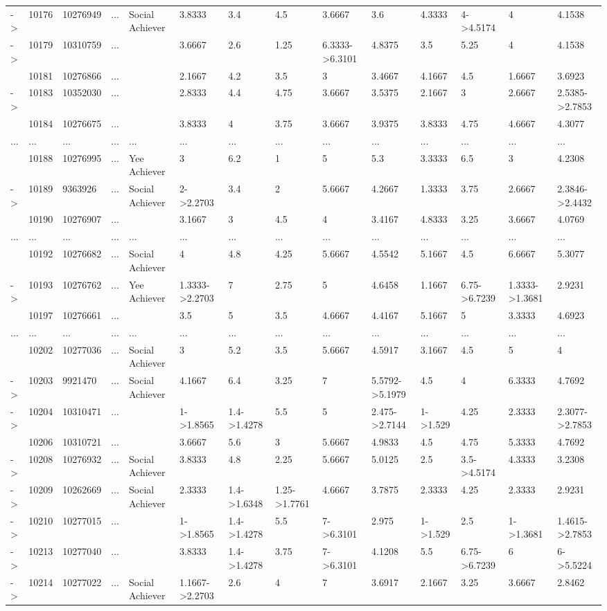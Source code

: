 \documentclass[6pt,a4paper]{article}
\begin{document}
\begin{landscape}
{\begin{longtable}{llllllllllllll}
-\textgreater &10176&10276949&...&Social Achiever&3.8333&3.4&4.5&3.6667&3.6&4.3333&4-\textgreater 4.5174&4&4.1538\tabularnewline
-\textgreater &10179&10310759&...&&3.6667&2.6&1.25&6.3333-\textgreater 6.3101&4.8375&3.5&5.25&4&4.1538\tabularnewline
&10181&10276866&...&&2.1667&4.2&3.5&3&3.4667&4.1667&4.5&1.6667&3.6923\tabularnewline
-\textgreater &10183&10352030&...&&2.8333&4.4&4.75&3.6667&3.5375&2.1667&3&2.6667&2.5385-\textgreater 2.7853\tabularnewline
&10184&10276675&...&&3.8333&4&3.75&3.6667&3.9375&3.8333&4.75&4.6667&4.3077\tabularnewline
...&...&...&...&...&...&...&...&...&...&...&...&...&...\tabularnewline
&10188&10276995&...&Yee Achiever&3&6.2&1&5&5.3&3.3333&6.5&3&4.2308\tabularnewline
-\textgreater &10189&9363926&...&Social Achiever&2-\textgreater 2.2703&3.4&2&5.6667&4.2667&1.3333&3.75&2.6667&2.3846-\textgreater 2.4432\tabularnewline
&10190&10276907&...&&3.1667&3&4.5&4&3.4167&4.8333&3.25&3.6667&4.0769\tabularnewline
...&...&...&...&...&...&...&...&...&...&...&...&...&...\tabularnewline
&10192&10276682&...&Social Achiever&4&4.8&4.25&5.6667&4.5542&5.1667&4.5&6.6667&5.3077\tabularnewline
-\textgreater &10193&10276762&...&Yee Achiever&1.3333-\textgreater 2.2703&7&2.75&5&4.6458&1.1667&6.75-\textgreater 6.7239&1.3333-\textgreater 1.3681&2.9231\tabularnewline
&10197&10276661&...&&3.5&5&3.5&4.6667&4.4167&5.1667&5&3.3333&4.6923\tabularnewline
...&...&...&...&...&...&...&...&...&...&...&...&...&...\tabularnewline
&10202&10277036&...&Social Achiever&3&5.2&3.5&5.6667&4.5917&3.1667&4.5&5&4\tabularnewline
-\textgreater &10203&9921470&...&Social Achiever&4.1667&6.4&3.25&7&5.5792-\textgreater 5.1979&4.5&4&6.3333&4.7692\tabularnewline
-\textgreater &10204&10310471&...&&1-\textgreater 1.8565&1.4-\textgreater 1.4278&5.5&5&2.475-\textgreater 2.7144&1-\textgreater 1.529&4.25&2.3333&2.3077-\textgreater 2.7853\tabularnewline
&10206&10310721&...&&3.6667&5.6&3&5.6667&4.9833&4.5&4.75&5.3333&4.7692\tabularnewline
-\textgreater &10208&10276932&...&Social Achiever&3.8333&4.8&2.25&5.6667&5.0125&2.5&3.5-\textgreater 4.5174&4.3333&3.2308\tabularnewline
-\textgreater &10209&10262669&...&Social Achiever&2.3333&1.4-\textgreater 1.6348&1.25-\textgreater 1.7761&4.6667&3.7875&2.3333&4.25&2.3333&2.9231\tabularnewline
-\textgreater &10210&10277015&...&&1-\textgreater 1.8565&1.4-\textgreater 1.4278&5.5&7-\textgreater 6.3101&2.975&1-\textgreater 1.529&2.5&1-\textgreater 1.3681&1.4615-\textgreater 2.7853\tabularnewline
-\textgreater &10213&10277040&...&&3.8333&1.4-\textgreater 1.4278&3.75&7-\textgreater 6.3101&4.1208&5.5&6.75-\textgreater 6.7239&6&6-\textgreater 5.5224\tabularnewline
-\textgreater &10214&10277022&...&Social Achiever&1.1667-\textgreater 2.2703&2.6&4&7&3.6917&2.1667&3.25&3.6667&2.8462\tabularnewline

\end{longtable}}
\end{landscape}
\end{document}
